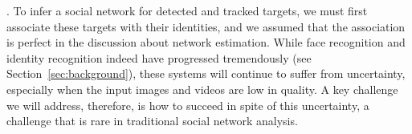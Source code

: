






. To infer a social network for detected and tracked targets, we must first associate these targets with their identities, and we assumed that the association is perfect in the discussion about network estimation. While face recognition and identity recognition indeed have progressed tremendously (see Section~\ref{sec:background}), these systems will continue to suffer from uncertainty, especially when the input images and videos are low in quality. A key challenge we will address, therefore, is how to succeed in spite of this uncertainty, a challenge that is rare in traditional social network analysis.

